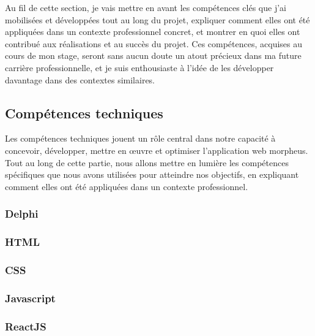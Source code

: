 \documentclass[a4paper, 12pt, french]{article}
\begin{document}
			Au fil de cette section, je vais mettre en avant les compétences clés que j'ai mobilisées et développées tout au long du projet, expliquer comment elles ont été appliquées dans un contexte professionnel concret, et montrer en quoi elles ont contribué aux réalisations et au succès du projet. Ces compétences, acquises au cours de mon stage, seront sans aucun doute un atout précieux dans ma future carrière professionnelle, et je suis enthousiaste à l'idée de les développer davantage dans des contextes similaires.

			\subsection{Compétences techniques}
				Les compétences techniques jouent un rôle central dans notre capacité à concevoir, développer, mettre en œuvre et optimiser l'application web morpheus. Tout au long de cette partie, nous allons mettre en lumière les compétences spécifiques que nous avons utilisées pour atteindre nos objectifs, en expliquant comment elles ont été appliquées dans un contexte professionnel.
				
				\subsubsection{Delphi}
				
				\subsubsection{HTML}
				
				\subsubsection{CSS}
				
				\subsubsection{Javascript}
				
				\subsubsection{ReactJS}
				
\end{document}

